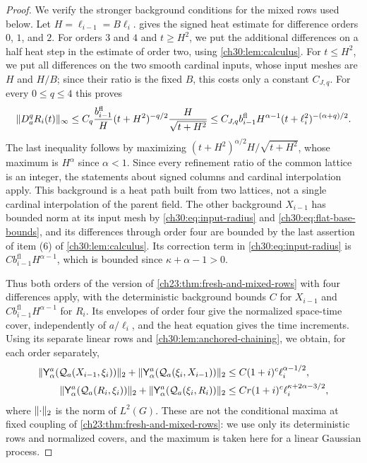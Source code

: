 \begin{proof}
We verify the stronger background conditions for the mixed rows used below. Let $H=\ell_{i-1}=B\ell_i$.  gives the signed heat estimate for difference orders $0$, $1$, and $2$. For orders $3$ and $4$ and $t\ge H^2$, we put the additional differences on a half heat step in the estimate of order two, using \cref{ch30:lem:calculus}. For $t\le H^2$, we put all differences on the two smooth cardinal inputs, whose input meshes are $H$ and $H/B$; since their ratio is the fixed $B$, this costs only a constant $C_{J,q}$. For every $0\le q\le4$ this proves
\begin{equation}\label{ch30:eq:linear-background-four}
 \lVert D_a^qR_i(t)\rVert_\infty\le C_q\frac{b_{i-1}^{\mathrm{fl}}}{H}(t+H^2)^{-q/2}\frac{H}{\sqrt{t+H^2}}\le C_{J,q}b_{i-1}^{\mathrm{fl}}H^{\alpha-1}(t+\ell_i^2)^{-(\alpha+q)/2}.
\end{equation}
The last inequality follows by maximizing $(t+H^2)^{\alpha/2}H/\sqrt{t+H^2}$, whose maximum is $H^\alpha$ since $\alpha<1$. Since every refinement ratio of the common lattice is an integer, the statements about signed columns and cardinal interpolation apply. This background is a heat path built from two lattices, not a single cardinal interpolation of the parent field. The other background $X_{i-1}$ has bounded norm at its input mesh by \eqref{ch30:eq:input-radius} and \eqref{ch30:eq:flat-base-bounds}, and its differences through order four are bounded by the last assertion of item (6) of \cref{ch30:lem:calculus}. Its correction term in \eqref{ch30:eq:input-radius} is $Cb_{i-1}^{\mathrm{fl}}H^{\alpha-1}$, which is bounded since $\kappa+\alpha-1>0$.

Thus both orders of the version of \cref{ch23:thm:fresh-and-mixed-rows} with four differences apply, with the deterministic background bounds $C$ for $X_{i-1}$ and $Cb_{i-1}^{\mathrm{fl}}H^{\alpha-1}$ for $R_i$. Its envelopes of order four give the normalized space-time cover, independently of $a/\ell_i$, and the heat equation gives the time increments. Using its separate linear rows and \cref{ch30:lem:anchored-chaining}, we obtain, for each order separately,
\begin{align}
 \lVert \mathsf Y_\alpha^a(\mathcal Q_{a}(X_{i-1},\xi_i))\rVert_2+\lVert \mathsf Y_\alpha^a(\mathcal Q_{a}(\xi_i,X_{i-1}))\rVert_2&\le C(1+i)^c\ell_i^{\alpha-1/2},\label{ch30:eq:linear-old-fresh}\\
 \lVert \mathsf Y_\alpha^a(\mathcal Q_{a}(R_i,\xi_i))\rVert_2+\lVert \mathsf Y_\alpha^a(\mathcal Q_{a}(\xi_i,R_i))\rVert_2&\le Cr(1+i)^c\ell_i^{\kappa+2\alpha-3/2},\label{ch30:eq:linear-fresh-defect}
\end{align}
where $\lVert \cdot\rVert_2$ is the norm of $L^2(G)$. These are not the conditional maxima at fixed coupling of \cref{ch23:thm:fresh-and-mixed-rows}: we use only its deterministic rows and normalized covers, and the maximum is taken here for a linear Gaussian process.


\end{proof}
